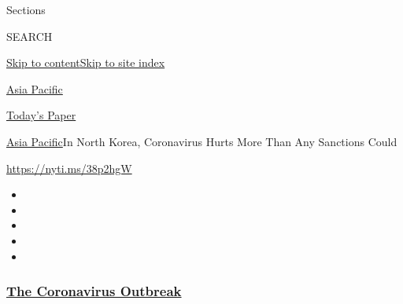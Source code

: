 Sections

SEARCH

\protect\hyperlink{site-content}{Skip to
content}\protect\hyperlink{site-index}{Skip to site index}

\href{https://www.nytimes3xbfgragh.onion/section/world/asia}{Asia
Pacific}

\href{https://myaccount.nytimes3xbfgragh.onion/auth/login?response_type=cookie\&client_id=vi}{}

\href{https://www.nytimes3xbfgragh.onion/section/todayspaper}{Today's
Paper}

\href{/section/world/asia}{Asia Pacific}\textbar{}In North Korea,
Coronavirus Hurts More Than Any Sanctions Could

\url{https://nyti.ms/38p2hgW}

\begin{itemize}
\item
\item
\item
\item
\item
\end{itemize}

\hypertarget{the-coronavirus-outbreak}{%
\subsubsection{\texorpdfstring{\href{https://www.nytimes3xbfgragh.onion/news-event/coronavirus?name=styln-coronavirus-national\&region=TOP_BANNER\&block=storyline_menu_recirc\&action=click\&pgtype=Article\&impression_id=21923ae0-f4b9-11ea-a90a-b333a65d9ace\&variant=undefined}{The
Coronavirus
Outbreak}}{The Coronavirus Outbreak}}\label{the-coronavirus-outbreak}}

